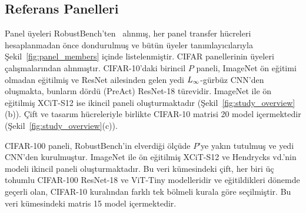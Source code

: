 \subsection{Referans Panelleri}
\label{subsec:panels}

Panel üyeleri RobustBench'ten~\cite{croce2021robustbench} alınmış, her panel transfer hücreleri hesaplanmadan önce dondurulmuş ve bütün üyeler tanımlayıcılarıyla Şekil~\ref{fig:panel_members} içinde listelenmiştir. CIFAR panellerinin üyeleri~\cite{wong2020fast, engstrom2019robustness, carmon2019unlabeled, gowal2020uncovering, sehwag2022robust, addepalli2022efficient, rade2022reducing, rice2020overfitting, pang2022robustness, wang2023better, jia2022lasat, debenedetti2023light, hendrycks2019using} çalışmalarından alınmıştır. CIFAR-10'daki birincil $P$ paneli, ImageNet ön eğitimi olmadan eğitilmiş ve ResNet ailesinden gelen yedi $L_\infty$-gürbüz CNN'den oluşmakta, bunların dördü (PreAct) ResNet-18 türevidir. ImageNet ile ön eğitilmiş XCiT-S12 ise ikincil paneli oluşturmaktadır (Şekil~\ref{fig:study_overview}(b)). Çift ve tasarım hücreleriyle birlikte CIFAR-10 matrisi 20 model içermektedir (Şekil~\ref{fig:study_overview}(c)).

CIFAR-100 paneli, RobustBench'in elverdiği ölçüde $P$'ye yakın tutulmuş ve yedi CNN'den kurulmuştur. ImageNet ile ön eğitilmiş XCiT-S12 ve Hendrycks vd.'nin modeli ikincil paneli oluşturmaktadır. Bu veri kümesindeki çift, her biri üç tohumlu CIFAR-100 ResNet-18 ve ViT-Tiny modelleridir ve eğitildikleri dönemde geçerli olan, CIFAR-10 kuralından farklı tek bölmeli kurala göre seçilmiştir. Bu veri kümesindeki matris 15 model içermektedir.

